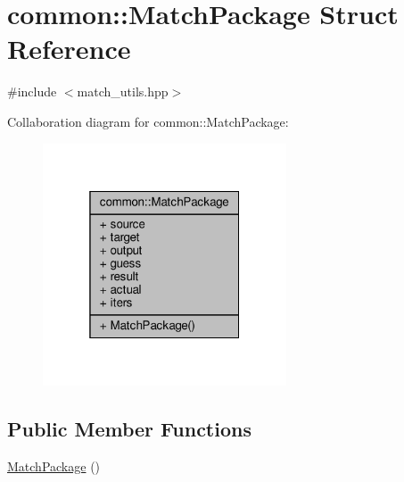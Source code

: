 \hypertarget{structcommon_1_1MatchPackage}{}\section{common\+:\+:Match\+Package Struct Reference}
\label{structcommon_1_1MatchPackage}


{\ttfamily \#include $<$match\+\_\+utils.\+hpp$>$}



Collaboration diagram for common\+:\+:Match\+Package\+:\nopagebreak
\begin{figure}[H]
\begin{center}
\leavevmode
\includegraphics[width=205pt]{d9/d88/structcommon_1_1MatchPackage__coll__graph}
\end{center}
\end{figure}
\subsection*{Public Member Functions}
\begin{DoxyCompactItemize}
\item 
\hyperlink{structcommon_1_1MatchPackage_affa0c8dc025d07ec5fd849ec8ef52aca}{Match\+Package} ()
\end{DoxyCompactItemize}
